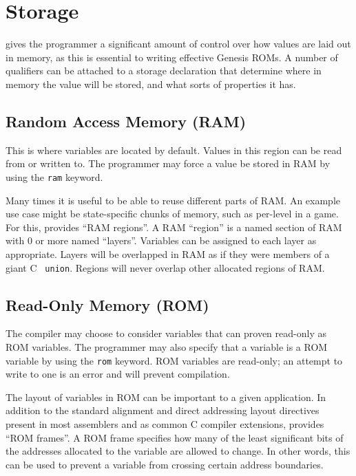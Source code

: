 \section{Storage}

\gx{} gives the programmer a significant amount of control over how values
are laid out in memory, as this is essential to writing effective Genesis
ROMs. A number of qualifiers can be attached to a storage declaration
that determine where in memory the value will be stored, and what sorts
of properties it has.

\subsection{Random Access Memory (RAM)}

This is where variables are located by default. Values in this region
can be read from or written to. The programmer may force a value be
stored in RAM by using the {\tt ram} keyword.

Many times it is useful to be able to reuse different parts of RAM. An
example use case might be state-specific chunks of memory, such as
per-level in a game. For this, \gx{} provides ``RAM regions''. A
RAM ``region'' is a named section of RAM with 0 or more named
``layers''. Variables can be assigned to each layer as appropriate. Layers
will be overlapped in RAM as if they were members of a giant C {\tt
union}. Regions will never overlap other allocated regions of RAM.

\subsection{Read-Only Memory (ROM)}

The compiler may choose to consider variables that can proven read-only
as ROM variables. The programmer may also specify that a variable is a
ROM variable by using the {\tt rom} keyword. ROM variables are read-only;
an attempt to write to one is an error and will prevent compilation.

The layout of variables in ROM can be important to a given application. In
addition to the standard alignment and direct addressing layout directives
present in most assemblers and as common C compiler extensions, \gx{}
provides ``ROM frames''. A ROM frame specifies how many of the least
significant bits of the addresses allocated to the variable are allowed
to change. In other words, this can be used to prevent a variable from
crossing certain address boundaries.
